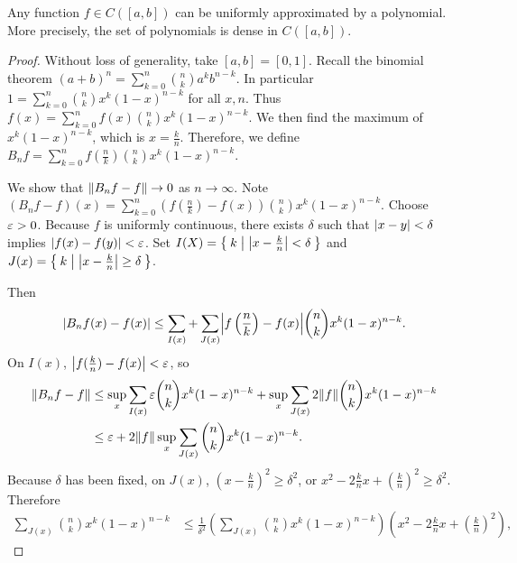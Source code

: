 \documentclass[10pt, twoside]{article}
\begin{document}
    \begin{thm} Any function $f \in
        C([a,b])$ can be uniformly approximated by a polynomial. More
        precisely, the set of polynomials is dense in $C([a,b])$.
        \begin{proof} Without loss of generality, take $[a,b] = [0,1]$. Recall
            the binomial theorem $(a+b)^n = \sum_{k=0}^n
            \binom{n}{k}a^kb^{n-k}$. In particular $1 = \sum_{k=0}^n
            \binom{n}{k}x^k(1-x)^{n-k}$ for all $x,n$. Thus $f(x) =
            \sum_{k=0}^n f(x) \binom{n}{k}x^k(1-x)^{n-k}$. We then find the
            maximum of $x^k(1-x)^{n-k}$, which is $x = \frac{k}{n}$. Therefore,
            we define $B_nf = \sum_{k=0}^n f\left(\frac{n}{k}\right)
            \binom{n}{k}x^k(1-x)^{n-k}$.

            We show that $\norm{B_n f -f} \rightarrow 0$ as $n \rightarrow
            \infty$. Note $(B_nf - f)(x) = \sum_{k=0}^n \left(
            f\left(\frac{n}{k}\right) - f(x) \right)
            \binom{n}{k}x^k(1-x)^{n-k}$. Choose $\ep > 0$. Because $f$ is
            uniformly continuous, there exists $\delta$ such that $\abs{x-y} <
            \delta$ implies $\abs{f(x) - f(y)} < \ep$. Set $I(X) = \Set{k |
            \abs*{x-\frac{k}{n}} < \delta}$ and $J(x) = \Set{k |
        \abs*{x-\frac{k}{n}} \geq \delta}$.

            Then \[\abs{B_nf(x) - f(x)} \leq \sum_{I(x)} + \sum_{J(x)}
                \abs*{f\left(\frac{n}{k}\right) - f(x)}
                \binom{n}{k}x^k(1-x)^{n-k}. \] On $I(x)$, $\abs*{f(\frac{k}{n})
                - f(x)} < \ep$, so \begin{align*} \norm*{B_nf - f} &\leq \sup_x
                    \sum_{I(x)} \ep \binom{n}{k}x^k(1-x)^{n-k} + \sup_x
                    \sum_{J(x)} 2 \norm{f} \binom{n}{k}x^k(1-x)^{n-k} \\ & \leq
                    \ep + 2 \norm{f} \sup_x \sum_{J(x)}
                    \binom{n}{k}x^k(1-x)^{n-k}.  \end{align*} Because $\delta$
                    has been fixed, on $J(x)$, $\left(x - \frac{k}{n}\right)^2
                    \geq \delta^2$, or $x^2 - 2 \frac{k}{n}x +
                    \left(\frac{k}{n}\right)^2 \geq \delta^2$. Therefore
                    \begin{align*} \sum_{J(x)} \binom{n}{k}x^k(1-x)^{n-k} &\leq
                    \frac{1}{\delta^2} \left(
                \sum_{J(x)}\binom{n}{k}x^k(1-x)^{n-k} \right) \left( x^2 - 2
        \frac{k}{n}x + \left(\frac{k}{n}\right)^2  \right), \end{align*}


\end{proof}
\end{thm}
\end{document}
